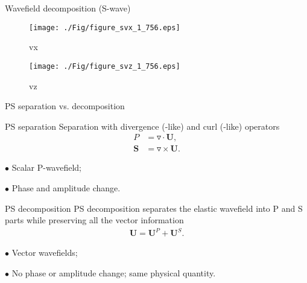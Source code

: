 \documentclass[aspectratio=169]{beamer}
\begin{document}
\begin{frame}{Wavefield decomposition (S-wave)}
   \begin{figure}[ht]
        \begin{minipage}[b]{0.45\linewidth}
            \centering
  	    \texttt{[image: ./Fig/figure\_svx\_1\_756.eps]}
            \caption{vx}
        \end{minipage}
        \hspace{0.5cm}
        \begin{minipage}[b]{0.45\linewidth}
            \centering
            \texttt{[image: ./Fig/figure\_svz\_1\_756.eps]}
            \caption{vz}
        \end{minipage}
    \end{figure}
\end{frame}
\begin{frame}{PS separation vs. decomposition}
\begin{block}{PS separation}
\small{Separation with divergence (-like) and curl (-like) operators}
\begin{eqnarray*}
P&=\triangledown \cdot \mathbf{U}, \\
\mathbf{S}&=\triangledown \times \mathbf{U}.
\end{eqnarray*}
\small{$\bullet$ Scalar P-wavefield;

$\bullet$ Phase and amplitude change.}
\end{block}

\begin{block}{PS decomposition}
\small{
PS decomposition separates the elastic wavefield into P and S parts while preserving all the vector information}
\begin{eqnarray*}
\mathbf{U}=\mathbf{U}^P+\mathbf{U}^S.
\end{eqnarray*}
\small{
\noindent $\bullet$ Vector wavefields;

$\bullet$ No phase or amplitude change; same physical quantity.}
\end{block}
\end{frame}
\end{document}
